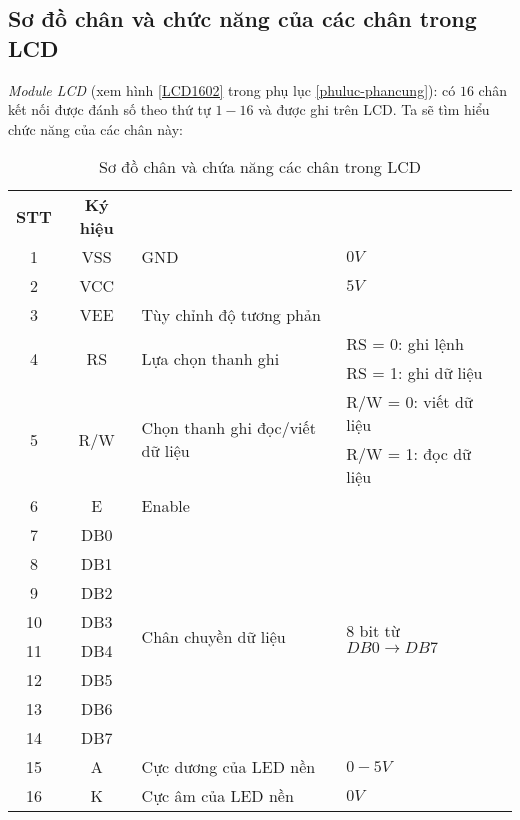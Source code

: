 \subsection{Sơ đồ chân và chức năng của các chân trong LCD}
\hspace{.6cm}\textit{Module LCD} (xem hình \ref{LCD1602} trong phụ lục \ref{phuluc-phancung}): có $16$ chân kết nối được đánh số theo thứ tự $1 - 16$ và được ghi trên LCD. Ta sẽ tìm hiểu chức năng của các chân này:
\begin{table}[h]
\begin{center}
\begin{tabular}{|c|c|p{6.5cm}|p{5cm}|l}\cline{1-4}
\textbf{STT} & \textbf{Ký hiệu} & \centering{\textbf{Mô tả}} & \centering{\textbf{Giá trị}} &\\ \cline{1-4}
1 & VSS & GND & $0V$ &\\ \cline{1-4}
2 & VCC & & $5V$ &\\ \cline{1-4}
3 & VEE & Tùy chỉnh độ tương phản & &\\ \cline{1-4}
\multirow{2}{.5cm}{ 4} & \multirow{2}{.8cm}{RS} & \multirow{2}{5cm}{Lựa chọn thanh ghi} & RS = 0: ghi lệnh & \\
& & & RS = 1: ghi dữ liệu &\\ \cline{1-4}
\multirow{2}{.5cm}{ 5} & \multirow{2}{.8cm}{R/W} & \multirow{2}{7cm}{Chọn thanh ghi đọc/viết dữ liệu} & R/W = 0: viết dữ liệu & \\
& & & R/W = 1: đọc dữ liệu &\\ \cline{1-4}
6 & E & Enable & &\\ \cline{1-4}
7 & DB0 & \multirow{8}{5cm}{Chân chuyền dữ liệu} & \multirow{8}{5cm}{8 bit từ $DB0 \rightarrow DB7$} & \\ 
8 & DB1 &  & & \\ 
9 & DB2 &  & & \\ 
10 & DB3 &  & & \\ 
11 & DB4 &  & & \\ 
12 & DB5 &  & & \\ 
13 & DB6 &  & & \\ 
14 & DB7 &  & &\\ \cline{1-4}
15 & A & Cực dương của LED nền & $0 - 5V$&\\ \cline{1-4}
16 & K & Cực âm của LED nền & $0V$ &\\ \cline{1-4}
\end{tabular}
\end{center}
\caption{Sơ đồ chân và chứa năng các chân trong LCD} \label{cnLCD}
\end{table}
